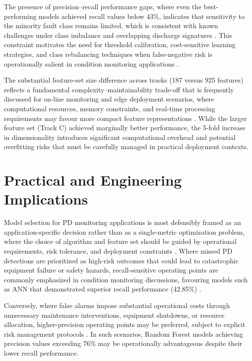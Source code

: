 The presence of precision--recall performance gaps, where even the best-performing models achieved recall values below 43\%, indicates that sensitivity to the minority fault class remains limited, which is consistent with known challenges under class imbalance and overlapping discharge signatures \parencite{Zemouri_2023_1, Aldosari_2023}. This constraint motivates the need for threshold calibration, cost-sensitive learning strategies, and class rebalancing techniques when false-negative risk is operationally salient in condition monitoring applications \parencite{Zemouri_2023_1, Adhikari_2024}.

The substantial feature-set size difference across tracks (187 versus 925 features) reflects a fundamental complexity--maintainability trade-off that is frequently discussed for on-line monitoring and edge deployment scenarios, where computational resources, memory constraints, and real-time processing requirements may favour more compact feature representations \parencite{Klein_2024_1, Sikorski_2025}. While the larger feature set (Track C) achieved marginally better performance, the 5-fold increase in dimensionality introduces significant computational overhead and potential overfitting risks that must be carefully managed in practical deployment contexts.

\section{Practical and Engineering Implications}

Model selection for PD monitoring applications is most defensibly framed as an application-specific decision rather than as a single-metric optimization problem, where the choice of algorithm and feature set should be guided by operational requirements, risk tolerance, and deployment constraints \parencite{Vera_2023_1, Sikorski_2025}. Where missed PD detections are prioritized as high-risk outcomes that could lead to catastrophic equipment failure or safety hazards, recall-sensitive operating points are commonly emphasized in condition monitoring discussions, favouring models such as ANN that demonstrated superior recall performance (42.85\%) \parencite{Hussain_2021, Adhikari_2024}.

Conversely, where false alarms impose substantial operational costs through unnecessary maintenance interventions, equipment shutdowns, or resource allocation, higher-precision operating points may be preferred, subject to explicit risk management protocols \parencite{Zemouri_2023_1, Sikorski_2025}. In such scenarios, Random Forest models achieving precision values exceeding 76\% may be operationally advantageous despite their lower recall performance.

